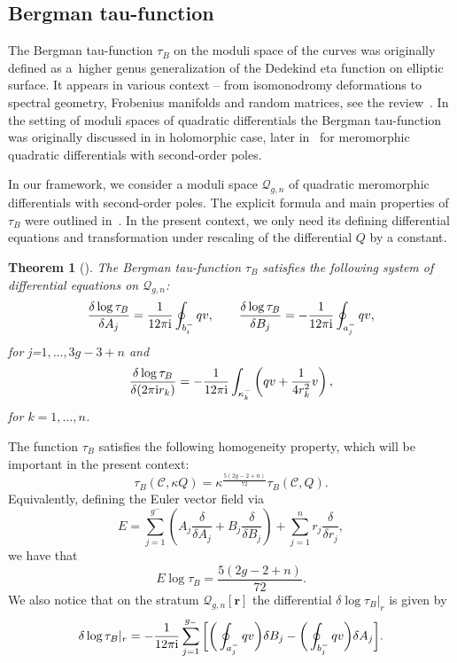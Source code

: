 \documentclass[pdftex]{sigma}
\numberwithin{equation}{section}
\newtheorem{Theorem}{Theorem}[section]
\theoremstyle{definition}
\begin{document}
\subsection{Bergman tau-function}
The Bergman tau-function $\tau_B$ on the moduli space of the curves was originally defined as a~higher genus generalization of the Dedekind eta function on elliptic surface. It appears in various context -- from isomonodromy deformations to
spectral geometry, Frobenius manifolds and random matrices, see the review~\cite{korotkin2020bergman}. In the setting of moduli
spaces of quadratic differentials the Bergman tau-function was originally discussed in \cite{korotkin2013tau} in holomorphic case, later in~\cite{Bertola_2020} for meromorphic quadratic differentials with second-order poles.

In our framework, we consider a moduli space $\mathcal{Q}_{g,n}$ of quadratic meromorphic differentials with second-order poles. The explicit formula and main properties of $\tau_B$ were outlined in~\cite{bertola2021wkb}. In the present context, we only need its defining differential equations and transformation under rescaling of the differential $Q$ by a constant.
\begin{Theorem}[\cite{bertola2021wkb}]
The Bergman tau-function $\tau_B$ satisfies the following system of differential equations on $\mathcal{Q}_{g,n}$:
\begin{equation}\label{55} \frac{\delta \log \tau_B}{\delta A_j }=\frac{1}{12 \pi {\rm i}}\oint_{b^-_i}qv, \qquad \frac{\delta \log \tau_B}{\delta B_j }=-\frac{1}{12 \pi {\rm i}}\oint_{a^-_j}qv,\end{equation}
for j=$1,\dots,3g-3+n$ and
\begin{equation}\label{56}\frac{\delta \log \tau_B}{\delta (2 \pi {\rm i} r_k) }=-\frac{1}{12 \pi {\rm i}}\int_{\kappa^-_k}\left(qv+\frac{1}{4r^2_k}v \right),\end{equation}
for $k=1,\dots,n$.
\end{Theorem}
The function $\tau_B$ satisfies the following homogeneity property, which will be important in the present context:
\begin{equation*}%
\tau_B(\mathcal{C}, \kappa Q) = \kappa^{ \frac{5(2g-2+n)}
{72}} \tau_B(\mathcal{C}, Q) .
\end{equation*}
Equivalently, defining the Euler vector field via
\begin{equation}\label{58}
E=\sum^{g^-}_{j=1}\left(A_j \frac{\delta}{\delta A_j}+B_j \frac{\delta}{\delta B_j}\right)+\sum^n_{j=1}r_j \frac{\delta}{\delta r_j}, \end{equation}
we have that
\begin{equation*}%
E \log{\tau_B}=\frac{5(2g-2+n)}{72}.
\end{equation*}
We also notice that on the stratum $\mathcal{Q}_{g,n}[\mathbf{r}]$ the differential $\delta \log \tau_B|_{r}$ is given by
\begin{equation}\label{60}
\delta \log \tau_B |_{r}=-\frac{1}{12 \pi {\rm i}}\sum^{g_-}_{j=1} \bigg[\bigg(\oint_{a^-_j}qv \bigg)\delta B_j - \bigg(\oint_{b^-_j}qv \bigg)\delta A_j \bigg].
\end{equation}
\end{document}
